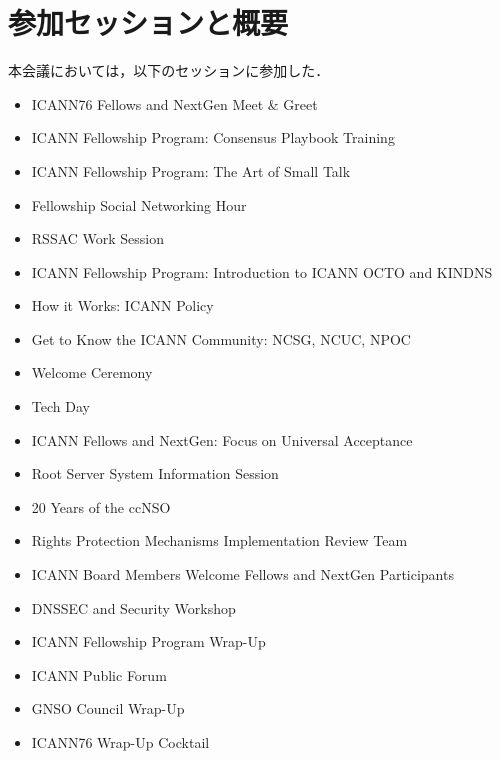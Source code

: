 \section{参加セッションと概要}

本会議においては，以下のセッションに参加した．

\begin{itemize}
  \item ICANN76 Fellows and NextGen Meet \& Greet
  \item ICANN Fellowship Program: Consensus Playbook Training
  \item ICANN Fellowship Program: The Art of Small Talk
  \item Fellowship Social Networking Hour

  \item RSSAC Work Session
  \item ICANN Fellowship Program: Introduction to ICANN OCTO and KINDNS
  \item How it Works: ICANN Policy
  \item Get to Know the ICANN Community: NCSG, NCUC, NPOC

  \item Welcome Ceremony
  \item Tech Day

  \item ICANN Fellows and NextGen: Focus on Universal Acceptance
  \item Root Server System Information Session
  \item 20 Years of the ccNSO

  \item Rights Protection Mechanisms Implementation Review Team
  \item ICANN Board Members Welcome Fellows and NextGen Participants
  \item DNSSEC and Security Workshop

  \item ICANN Fellowship Program Wrap-Up
  \item ICANN Public Forum
  \item GNSO Council Wrap-Up
  \item ICANN76 Wrap-Up Cocktail
\end{itemize}